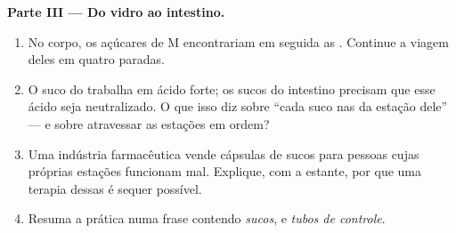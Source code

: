 \begin{problem}
\medskip\noindent\textbf{Parte III --- Do vidro ao intestino.}
\begin{enumerate}[resume]
  \item No corpo, os açúcares de M encontrariam em seguida as
        . Continue a viagem deles em quatro paradas.
  \item O suco do  trabalha em ácido forte; os sucos do
        intestino precisam que esse ácido seja neutralizado. O que
        isso diz sobre ``cada suco nas  da estação dele'' ---
        e sobre atravessar as estações em ordem?
  \item Uma indústria farmacêutica vende cápsulas de sucos para
        pessoas cujas próprias estações funcionam mal. Explique, com a
        estante, por que uma terapia dessas é sequer possível.
  \item Resuma a prática numa frase contendo \emph{sucos},
        \emph{} e \emph{tubos de controle}.
\end{enumerate}
\end{problem}
